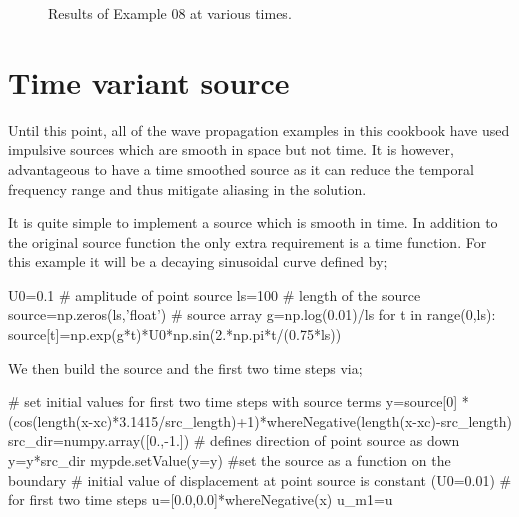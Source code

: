 \begin{figure}[htp]
{\label{fig:ex08pw650}
}
\label{fig:ex08pw}
\caption{Results of Example 08 at various times.}
\end{figure}

\section{Time variant source}


Until this point, all of the wave propagation examples in this cookbook have
used impulsive sources which are smooth in space but not time. It is however,
advantageous to have a time smoothed source as it can reduce the temporal
frequency range and thus mitigate aliasing in the solution. 


It is quite 
simple to implement a source which is smooth in time. In addition to the
original source function the only extra requirement is a time function. For
this example it will be a decaying sinusoidal curve defined by;
\begin{python}
U0=0.1 # amplitude of point source
ls=100   # length of the source
source=np.zeros(ls,'float') # source array
g=np.log(0.01)/ls
for t in range(0,ls):
    source[t]=np.exp(g*t)*U0*np.sin(2.*np.pi*t/(0.75*ls))
\end{python}

We then build the source and the first two time steps via;
\begin{python}
# set initial values for first two time steps with source terms
y=source[0]
*(cos(length(x-xc)*3.1415/src_length)+1)*whereNegative(length(x-xc)-src_length)
src_dir=numpy.array([0.,-1.]) # defines direction of point source as down
y=y*src_dir
mypde.setValue(y=y) #set the source as a function on the boundary
# initial value of displacement at point source is constant (U0=0.01)
# for first two time steps
u=[0.0,0.0]*whereNegative(x)
u_m1=u
\end{python}

